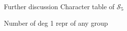 \documentclass[handout, 10pt]{beamer}
\newcommand{\Sym}{\mathcal{S}}
\begin{document}
	\begin{frame}{Further discussion}
		Character table of $\Sym_5$
		
		Number of deg 1 repr of any group
	\end{frame}
	
%	
%	
%		
%	
\end{document}
